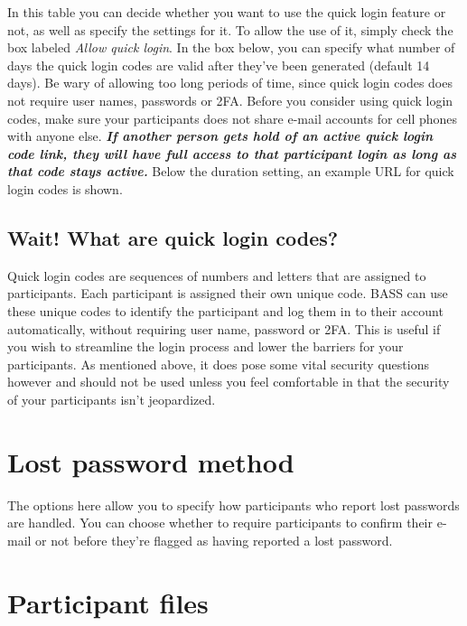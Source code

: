\documentclass[]{book}
\begin{document}
In this table you can decide whether you want to use the quick login feature or not, as well as specify the settings for it. To allow the use of it, simply check the box labeled \emph{Allow quick login}.
In the box below, you can specify what number of days the quick login codes are valid after they've been generated (default 14 days). Be wary of allowing too long periods of time, since quick login codes does not require user names, passwords or 2FA. Before you consider using quick login codes, make sure your participants does not share e-mail accounts for cell phones with anyone else. \textbf{\emph{If another person gets hold of an active quick login code link, they will have full access to that participant login as long as that code stays active.}}
Below the duration setting, an example URL for quick login codes is shown.

\hypertarget{wait-what-are-quick-login-codes}{%
\subsection{Wait! What are quick login codes?}\label{wait-what-are-quick-login-codes}}

Quick login codes are sequences of numbers and letters that are assigned to participants. Each participant is assigned their own unique code. BASS can use these unique codes to identify the participant and log them in to their account automatically, without requiring user name, password or 2FA. This is useful if you wish to streamline the login process and lower the barriers for your participants. As mentioned above, it does pose some vital security questions however and should not be used unless you feel comfortable in that the security of your participants isn't jeopardized.

\hypertarget{lost-password-method}{%
\section{Lost password method}\label{lost-password-method}}

The options here allow you to specify how participants who report lost passwords are handled. You can choose whether to require participants to confirm their e-mail or not before they're flagged as having reported a lost password.

\hypertarget{participant-files}{%
\section{Participant files}\label{participant-files}}
\end{document}
